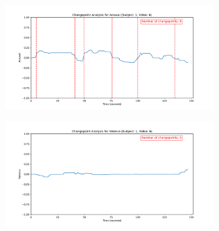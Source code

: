 \documentclass[11pt, letterpaper]{article}
\begin{document}
\begin{figure}
        \centering
    \begin{subfigure}[t]{0.49\textwidth}
        \centering
        \includegraphics[width=\linewidth]{sub_1_changepoints_V6_arousal} 
        \caption{} \label{fig:sub_1_changepoints_V6_arousal}
    \end{subfigure}
    \hfill
    \begin{subfigure}[t]{0.49\textwidth}
        \centering
        \includegraphics[width=\linewidth]{sub_1_changepoints_V6_valence} 
        \caption{} \label{fig:sub_1_changepoints_V6_valence}
    \end{subfigure}

    \vspace{1cm}
    

\end{figure}
\end{document}
